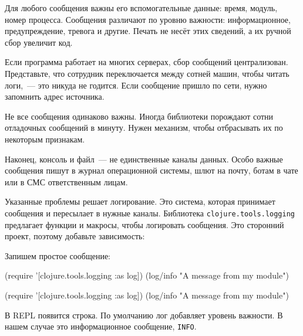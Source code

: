 Для любого сообщения важны его вспомогательные данные: время, модуль, номер
процесса. Сообщения различают по уровню важности: информационное,
предупреждение, тревога и другие. Печать не несёт этих сведений, а их ручной
сбор увеличит код.

Если программа работает на многих серверах, сбор сообщений
централизован. Представьте, что сотрудник переключается между сотней машин,
чтобы читать логи,~--- это никуда не годится. Если сообщение пришло по сети,
нужно запомнить адрес источника.

Не все сообщения одинаково важны. Иногда библиотеки порождают сотни отладочных
сообщений в минуту. Нужен механизм, чтобы отбрасывать их по некоторым признакам.

Наконец, консоль и файл~--- не единственные каналы данных. Особо важные
сообщения пишут в журнал операционной системы, шлют на почту, ботам в чате или в
СМС ответственным лицам.

Указанные проблемы решает логирование. Это система, которая принимает сообщения
и пересылает в нужные каналы. Библиотека \verb|clojure.tools.logging|
предлагает функции и макросы, чтобы логировать сообщения. Это сторонний проект,
поэтому добавьте зависимость:


\begin{english}
  \begin{clojure}
  \end{clojure}
\end{english}

\noindent
Запишем простое сообщение:

\ifx\devicetype\mobile

\begin{english}
  \begin{clojure}
(require
  '[clojure.tools.logging :as log])
(log/info "A message from my module")
  \end{clojure}
\end{english}

\else

\begin{english}
  \begin{clojure}
(require '[clojure.tools.logging :as log])
(log/info "A message from my module")
  \end{clojure}
\end{english}

\fi

\noindent
В REPL появится строка. По умолчанию лог добавляет уровень важности. В нашем
случае это информационное сообщение, \verb|INFO|.

